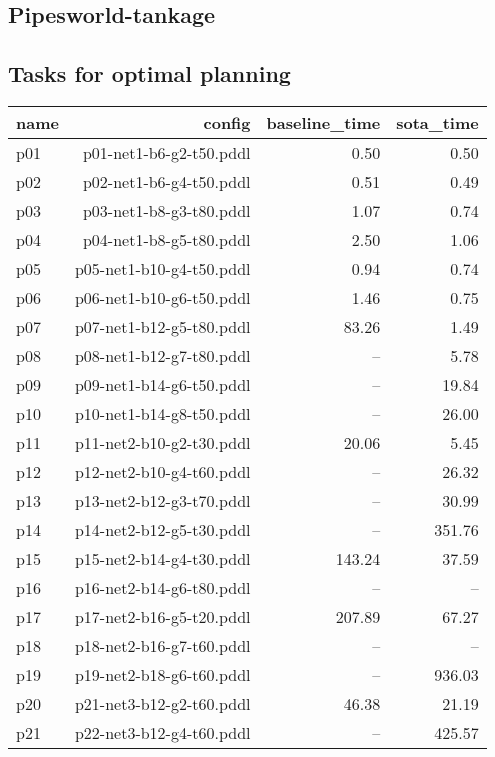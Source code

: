 \documentclass{article}
\begin{document}
                \newpage \subsection{Pipesworld-tankage}
                    \subsection*{Tasks for optimal planning}
                    
                            \begin{center}
                            \scriptsize
                            \begin{tabular}{@{}l|r|r|r@{}}
                            name & config & baseline\_time & sota\_time\\\midrule
                              p01& p01-net1-b6-g2-t50.pddl&0.50&0.50\\
  p02& p02-net1-b6-g4-t50.pddl&0.51&0.49\\
  p03& p03-net1-b8-g3-t80.pddl&1.07&0.74\\
  p04& p04-net1-b8-g5-t80.pddl&2.50&1.06\\
  p05& p05-net1-b10-g4-t50.pddl&0.94&0.74\\
  p06& p06-net1-b10-g6-t50.pddl&1.46&0.75\\
  p07& p07-net1-b12-g5-t80.pddl&83.26&1.49\\
  p08& p08-net1-b12-g7-t80.pddl&--&5.78\\
  p09& p09-net1-b14-g6-t50.pddl&--&19.84\\
  p10& p10-net1-b14-g8-t50.pddl&--&26.00\\
  p11& p11-net2-b10-g2-t30.pddl&20.06&5.45\\
  p12& p12-net2-b10-g4-t60.pddl&--&26.32\\
  p13& p13-net2-b12-g3-t70.pddl&--&30.99\\
  p14& p14-net2-b12-g5-t30.pddl&--&351.76\\
  p15& p15-net2-b14-g4-t30.pddl&143.24&37.59\\
  p16& p16-net2-b14-g6-t80.pddl&--&--\\
  p17& p17-net2-b16-g5-t20.pddl&207.89&67.27\\
  p18& p18-net2-b16-g7-t60.pddl&--&--\\
  p19& p19-net2-b18-g6-t60.pddl&--&936.03\\
  p20& p21-net3-b12-g2-t60.pddl&46.38&21.19\\
  p21& p22-net3-b12-g4-t60.pddl&--&425.57\\

\end{tabular}
\end{center}
\end{document}
